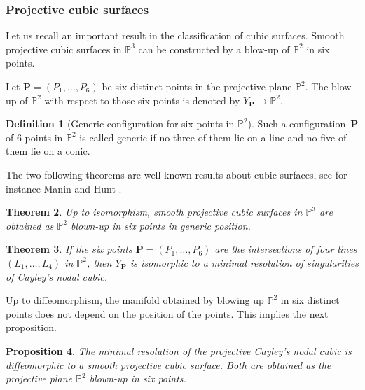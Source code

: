 \documentclass[JEP,XML,SOM,NoEqCountersInSection,Unicode,published]{cedram}
\theoremstyle{definition}
\newtheorem{definition}{Definition}[section]
\theoremstyle{plain}
\newtheorem{theorem}[definition]{Theorem}
\newtheorem{proposition}[definition]{Proposition}
\begin{document}
\subsubsection{Projective cubic surfaces}

Let us recall an important result in the classification of cubic surfaces. Smooth projective cubic surfaces in $\mathbb{P}^3$ can be constructed by a blow-up of $\mathbb{P}^2$ in six points.

Let $\boldsymbol{P}=(P_1,\dots,P_6)$ be six distinct points in the projective plane $\mathbb{P}^2$. The blow-up of $\mathbb{P}^2$ with respect to those six points is denoted by $Y_{\boldsymbol{P}}\to \mathbb{P}^2$.

\begin{definition}[Generic configuration for six points in $\mathbb{P}^2$]
Such a configuration~$\boldsymbol{P}$ of $6$ points in $\mathbb{P}^2$ is called generic if no three of them lie on a line and no five of them lie on a conic.
\end{definition}
The two following theorems are well-known results about cubic surfaces, see for instance Manin \cite{Manin1986} and Hunt \cite{Hunt}.
\begin{theorem}\label{th_cubic_six}
Up to isomorphism, smooth projective cubic surfaces in $\mathbb{P}^3$ are obtained as $\mathbb{P}^2$ blown-up in six points in generic position.
\end{theorem}
\begin{theorem}\label{th_cayley_six}
If the six points $\boldsymbol{P}=(P_1,\dots,P_6)$ are the intersections of four lines $(L_1,\dots,L_4)$ in $\mathbb{P}^2$, then $Y_{\boldsymbol{P}}$ is isomorphic to a minimal resolution of singularities of Cayley's nodal cubic.
\end{theorem}

Up to diffeomorphism, the manifold obtained by blowing up $\mathbb{P}^2$ in six distinct points does not depend on the position of the points. This implies the next proposition.

\begin{proposition}
The minimal resolution of the projective Cayley's nodal cubic is diffeomorphic to a smooth projective cubic surface. Both are obtained as the projective plane $\mathbb{P}^2$ blown-up in six points.
\end{proposition}
\end{document}
